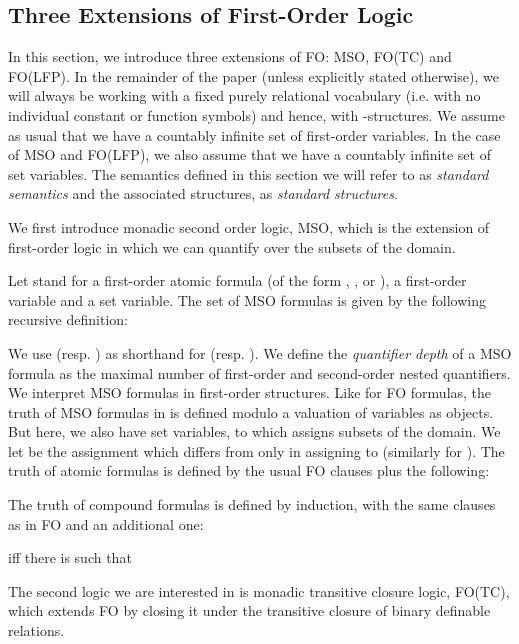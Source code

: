 \documentclass{LMCS}
\newcommand{\fo}{\textsf{FO}\xspace}
\newcommand{\mso}{\textsf{MSO}\xspace}
\newcommand{\fotc}{\textsf{FO(TC)}\xspace}
\newcommand{\folfp}{\textsf{FO(LFP)}\xspace}
\begin{document}
\subsection{Three Extensions of First-Order Logic}
\label{seclog}
In this section, we introduce three extensions of \fo : \mso, \fotc and \folfp. In the remainder of the paper (unless explicitly
stated otherwise), we will always be working with a fixed purely relational vocabulary  (i.e. with no individual constant or function symbols) and hence, with -structures. We assume as usual that we have a countably infinite set of first-order variables. In the case of
\mso and \folfp, we also assume that we have a countably infinite set of set variables. The semantics defined in this section we will refer to as
\textit{standard semantics} and the associated structures, as \textit{standard structures}.


We first introduce monadic second order logic, \mso, which is the
extension of first-order logic in which we can quantify over the subsets of the
domain.
\begin{defi}
[Syntax and semantics of \mso]
    Let  stand for a first-order atomic formula (of the form
    , , or ),  a first-order variable and  a set
    variable. The set of \mso formulas is given by the following
    recursive definition:



We use  (resp. ) as shorthand for
 (resp. ). We
define the \textit{quantifier depth} of a \mso formula as the maximal
number of first-order and second-order nested quantifiers.
We interpret \mso formulas in first-order structures.
Like for \fo formulas, the truth of \mso
formulas in  is defined modulo a valuation  of variables
as objects. But here, we also have set variables,
to which  assigns
subsets of the domain. We let  be the
assignment which differs from  only in assigning  to  (similarly for ).
The truth of atomic formulas is defined by the usual
\fo clauses plus the following:


The truth of compound formulas is defined by induction, with the
same clauses as in \fo and an additional one:
\begin{center}
 iff there is  such
that 
\end{center}
\end{defi}

The second logic we are interested in is monadic transitive
closure logic, \fotc, which extends \fo by closing it under the
transitive closure of binary definable relations.
\end{document}
